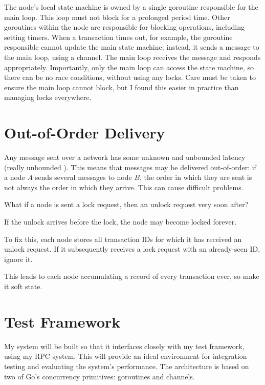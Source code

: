 \documentclass[12pt,a4paper,twoside,openright]{report}
\begin{document}
The node's local state machine is owned by a single goroutine responsible for the main loop. This loop must not block for a prolonged period time. Other goroutines within the node are responsible for blocking operations, including setting timers. When a transaction times out, for example, the goroutine responsible cannot update the main state machine; instead, it sends a message to the main loop, using a channel. The main loop receives the message and responds appropriately. Importantly, only the main loop can access the state machine, so there can be no race conditions, without using any locks. Care must be taken to ensure the main loop cannot block, but I found this easier in practice than managing locks everywhere.

\section{Out-of-Order Delivery}

Any message sent over a network has some unknown and unbounded latency (really unbounded \cite{imbriaco_2012}). This means that messages may be delivered out-of-order: if a node $A$ sends several messages to node $B$, the order in which they are sent is not always the order in which they arrive. This can cause difficult problems.

What if a node is sent a lock request, then an unlock request very soon after? %

If the unlock arrives before the lock, the node may become locked forever.

To fix this, each node stores all transaction IDs for which it has received an unlock request. If it subsequently receives a lock request with an already-seen ID, ignore it.

This leads to each node accumulating a record of every transaction ever, so make it soft state.

\section{Test Framework}


My system will be built so that it interfaces closely with my test framework, using my RPC system. This will provide an ideal environment for integration testing and evaluating the system's performance. The architecture is based on two of Go's concurrency primitives: goroutines and channels.
\end{document}
